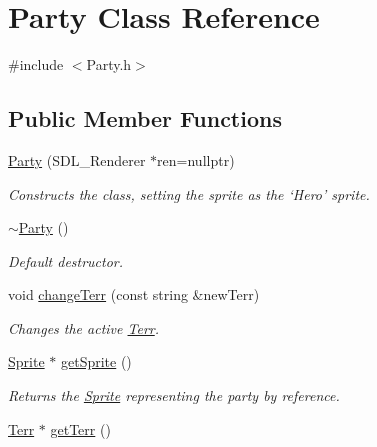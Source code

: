 \hypertarget{class_party}{}\section{Party Class Reference}
\label{class_party}


{\ttfamily \#include $<$Party.\+h$>$}

\subsection*{Public Member Functions}
\begin{DoxyCompactItemize}
\item 
\hyperlink{class_party_a2ac633ed4c5b4171c463a6db02048291}{Party} (S\+D\+L\+\_\+\+Renderer $\ast$ren=nullptr)\hypertarget{class_party_a2ac633ed4c5b4171c463a6db02048291}{}\label{class_party_a2ac633ed4c5b4171c463a6db02048291}

\begin{DoxyCompactList}\small\item\em Constructs the class, setting the sprite as the ‘\+Hero’ sprite. \end{DoxyCompactList}\item 
\hyperlink{class_party_a85aa837e38a06690e6fee5087d7c7ad7}{$\sim$\+Party} ()\hypertarget{class_party_a85aa837e38a06690e6fee5087d7c7ad7}{}\label{class_party_a85aa837e38a06690e6fee5087d7c7ad7}

\begin{DoxyCompactList}\small\item\em Default destructor. \end{DoxyCompactList}\item 
void \hyperlink{class_party_a5b4e7bc4d910ad64722629b2fe365240}{change\+Terr} (const string \&new\+Terr)\hypertarget{class_party_a5b4e7bc4d910ad64722629b2fe365240}{}\label{class_party_a5b4e7bc4d910ad64722629b2fe365240}

\begin{DoxyCompactList}\small\item\em Changes the active \hyperlink{class_terr}{Terr}. \end{DoxyCompactList}\item 
\hyperlink{class_sprite}{Sprite} $\ast$ \hyperlink{class_party_a79d7e55a83b66a41146679deb3b4c533}{get\+Sprite} ()\hypertarget{class_party_a79d7e55a83b66a41146679deb3b4c533}{}\label{class_party_a79d7e55a83b66a41146679deb3b4c533}

\begin{DoxyCompactList}\small\item\em Returns the \hyperlink{class_sprite}{Sprite} representing the party by reference. \end{DoxyCompactList}\item 
\hyperlink{class_terr}{Terr} $\ast$ \hyperlink{class_party_ae0a1a365f425b46efdf315998465503f}{get\+Terr} ()\hypertarget{class_party_ae0a1a365f425b46efdf315998465503f}{}\label{class_party_ae0a1a365f425b46efdf315998465503f}


\end{DoxyCompactItemize}
